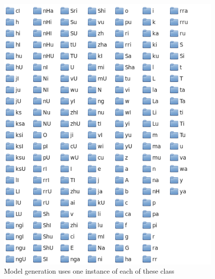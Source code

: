 \begin{figure}\centering
\includegraphics[scale=0.7]{./img/model_gen} 
  \caption{Model generation uses one instance of each of these class}\label{MGEN}
  \end{figure}

